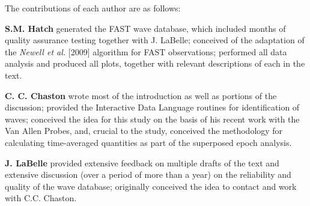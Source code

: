 The contributions of each author are as follows:

\textbf{S.M. Hatch} generated the FAST \Alf wave database, which
included months of quality assurance testing together with J. LaBelle;
conceived of the adaptation of the \textsl{Newell et al.} [2009]
algorithm for FAST observations; performed all data analysis and
produced all plots, together with relevant descriptions of each in the
text.

\textbf{C. C. Chaston} wrote most of the introduction as well as
portions of the discussion; provided the Interactive Data Language
routines for identification of \Alf waves; conceived the idea for this
study on the basis of his recent work with the Van Allen Probes, and,
crucial to the study, conceived the methodology for calculating
time-averaged quantities as part of the superposed epoch analysis.

\textbf{J. LaBelle} provided extensive feedback on multiple drafts of
the text and extensive discussion (over a period of more than a year)
on the reliability and quality of the \Alf wave database; originally
conceived the idea to contact and work with C.C. Chaston.







